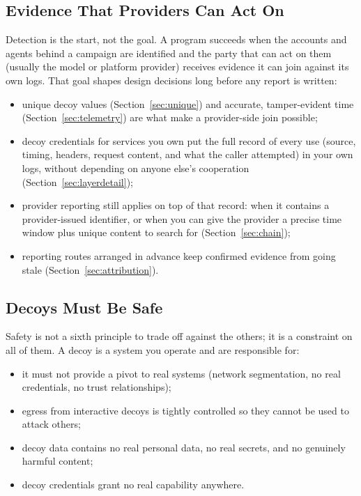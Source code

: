 \documentclass[11pt,letterpaper]{article}
\begin{document}
\subsection{Evidence That Providers Can Act On}
\label{sec:actionable}

Detection is the start, not the goal. A program succeeds when the accounts and agents behind a campaign are identified and the party that can act on them (usually the model or platform provider) receives evidence it can join against its own logs. That goal shapes design decisions long before any report is written:

\begin{itemize}
  \item unique decoy values (Section~\ref{sec:unique}) and accurate, tamper-evident time (Section~\ref{sec:telemetry}) are what make a provider-side join possible;
  \item decoy credentials for services you own put the full record of every use (source, timing, headers, request content, and what the caller attempted) in your own logs, without depending on anyone else's cooperation (Section~\ref{sec:layerdetail});
  \item provider reporting still applies on top of that record: when it contains a provider-issued identifier, or when you can give the provider a precise time window plus unique content to search for (Section~\ref{sec:chain});
  \item reporting routes arranged in advance keep confirmed evidence from going stale (Section~\ref{sec:attribution}).
\end{itemize}

\subsection{Decoys Must Be Safe}
\label{sec:safe}

Safety is not a sixth principle to trade off against the others; it is a constraint on all of them. A decoy is a system you operate and are responsible for:

\begin{itemize}
  \item it must not provide a pivot to real systems (network segmentation, no real credentials, no trust relationships);
  \item egress from interactive decoys is tightly controlled so they cannot be used to attack others;
  \item decoy data contains no real personal data, no real secrets, and no genuinely harmful content;
  \item decoy credentials grant no real capability anywhere.
\end{itemize}
\end{document}
